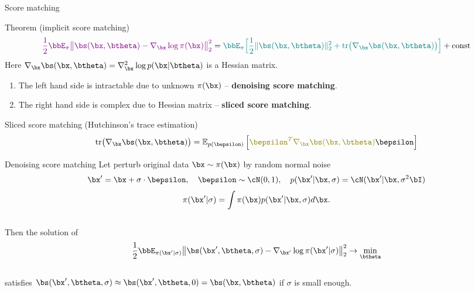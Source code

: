 \begin{frame}{Score matching}
	\vspace{-0.3cm}
	\begin{block}{Theorem (implicit score matching)}
		\vspace{-0.6cm}
		\[
		{\color{violet}\frac{1}{2} \bbE_{\pi}\bigl\| \bs(\bx, \btheta) - \nabla_\bx \log \pi(\bx) \bigr\|^2_2} = {\color{teal}\bbE_{\pi}\Bigr[ \frac{1}{2}\| \bs(\bx, \btheta) \|_2^2 + \text{tr}\bigl(\nabla_{\bx} \bs(\bx, \btheta)\bigr) \Bigr]} + \text{const}
		\]
		Here $\nabla_{\bx} \bs(\bx, \btheta) = \nabla_{\bx}^2 \log p(\bx | \btheta)$ is a Hessian matrix.
	\end{block}
	\begin{enumerate}
		\item {\color{violet}The left hand side} is intractable due to unknown $\pi(\bx)$ -- \textbf{denoising score matching}. 
		\item {\color{teal}The right hand side} is complex due to Hessian matrix -- \textbf{sliced score matching}.
	\end{enumerate}
	\begin{block}{Sliced score matching (Hutchinson's trace estimation)}
	\vspace{-0.3cm}
	\[
		\text{tr}\bigl(\nabla_{\bx} \bs(\bx, \btheta)\bigr) = \mathbb{E}_{p(\bepsilon)} \left[ {\color{olive}\bepsilon^T \nabla_{\bx} \bs(\bx, \btheta)} \bepsilon \right]
	\]
	\end{block}
\end{frame}
\begin{frame}{Denoising score matching}
	Let perturb original data $\bx \sim \pi(\bx)$ by random normal noise 
	\[
		\bx' = \bx + \sigma \cdot \bepsilon, \quad \bepsilon \sim \cN(0, 1), \quad p(\bx' | \bx, \sigma) = \cN(\bx' | \bx, \sigma^2 \bI)
	\]
	\vspace{-0.4cm}
	\[
		\pi(\bx' | \sigma) = \int \pi(\bx) p(\bx' | \bx, \sigma) d\bx.
	\]
	\vspace{-0.4cm} \\
	Then the solution of 
	\[
		\frac{1}{2} \bbE_{\pi(\bx' | \sigma)}\bigl\| \bs(\bx', \btheta, \sigma) - \nabla_{\bx'} \log \pi(\bx' | \sigma) \bigr\|^2_2 \rightarrow \min_{\btheta}
	\]
	\vspace{-0.3cm} \\
	satisfies $\bs(\bx', \btheta, \sigma) \approx \bs(\bx', \btheta, 0) = \bs(\bx, \btheta)$ if $\sigma$ is small enough.
\end{frame}

